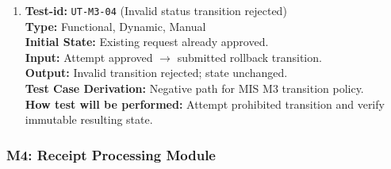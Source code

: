 \documentclass[12pt, titlepage]{article}
\begin{document}
\begin{enumerate}
\item \textbf{Test-id:} \texttt{UT-M3-04} (Invalid status transition rejected)\\
\textbf{Type:} Functional, Dynamic, Manual\\
\textbf{Initial State:} Existing request already approved.\\
\textbf{Input:} Attempt approved $\rightarrow$ submitted rollback transition.\\
\textbf{Output:} Invalid transition rejected; state unchanged.\\
\textbf{Test Case Derivation:} Negative path for MIS M3 transition policy.\\
\textbf{How test will be performed:} Attempt prohibited transition and verify immutable resulting state.

\end{enumerate}

\subsubsection{M4: Receipt Processing Module}
\end{document}
